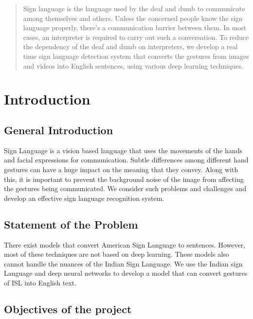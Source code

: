 \documentclass[12pt,oneside,a4paper]{article}
\begin{document}
	\null
	\vspace{\fill}

	\begin{abstract}
		\normalsize
		\doublespacing
		Sign language is the language used by the deaf and dumb to communicate among themselves and others. Unless the concerned people know the sign language properly, there's a communication barrier between them. In most cases, an interpreter is required to carry out such a conversation. To reduce the dependency of the deaf and dumb on interpreters, we develop a real time sign language detection system that converts the gestures from images and videos into English sentences, using various deep learning techniques.
	\end{abstract}

	\vspace{\fill}
	\null
	\newpage

	\tableofcontents

	\newpage

	\section{Introduction}

		\subsection{General Introduction}
			Sign Language is a vision based language that uses the movements of the hands and facial expressions for communication. Subtle differences among different hand gestures can have a huge impact on the meaning that they convey. Along with this, it is important to prevent the background noise of the image from affecting the gestures being communicated. We consider such problems and challenges and develop an effective sign language recognition system.

		\subsection{Statement of the Problem}
			There exist models that convert American Sign Language to sentences. However, most of these techniques are not based on deep learning. These models also cannot handle the nuances of the Indian Sign Language. We use the Indian sign Language and deep neural networks to develop a model that can convert gestures of ISL into English text.

		\subsection{Objectives of the project}
\end{document}
